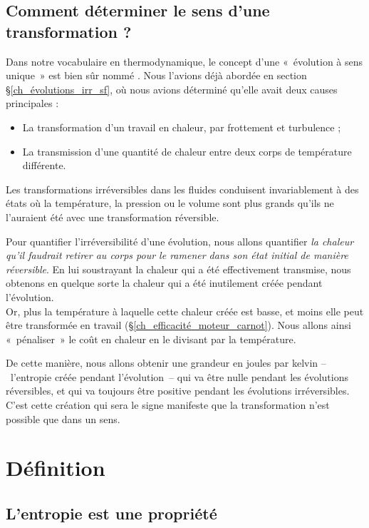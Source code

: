 	\subsection{Comment déterminer le sens d’une transformation ?}
	
		Dans notre vocabulaire en thermodynamique, le concept d’une «~évolution à sens unique~» est bien sûr nommé . Nous l’avions déjà abordée en section \S\ref{ch_évolutions_irr_sf}, où nous avions déterminé qu’elle avait deux causes principales :
			\begin{itemize}
				\item La transformation d’un travail en chaleur, par frottement et turbulence ;
				\item La transmission d’une quantité de chaleur entre deux corps de température différente.
			\end{itemize}
		
		Les transformations irréversibles dans les fluides conduisent invariablement à des états où la température, la pression ou le volume sont plus grands qu’ils ne l’auraient été avec une transformation réversible. 
		
		Pour quantifier l’irréversibilité d’une évolution, nous allons quantifier \emph{la chaleur qu’il faudrait retirer au corps pour le ramener dans son état initial de manière réversible}. En lui soustrayant la chaleur qui a été effectivement transmise, nous obtenons en quelque sorte la chaleur qui a été inutilement créée pendant l’évolution.\\
		Or, plus la température à laquelle cette chaleur créée est basse, et moins elle peut être transformée en travail (\S\ref{ch_efficacité_moteur_carnot}). Nous allons ainsi «~pénaliser~» le coût en chaleur en le divisant par la température.
		
		De cette manière, nous allons obtenir une grandeur en \si{joules} par \si{kelvin} --\ l’entropie créée pendant l’évolution\ -- qui va être nulle pendant les évolutions réversibles, et qui va toujours être positive pendant les évolutions irréversibles. C’est cette création qui sera le signe manifeste que la transformation n’est possible que dans un sens. %

\section{Définition}

	\subsection{L’entropie est une propriété}
	\label{ch_entropie_propriete}
	
